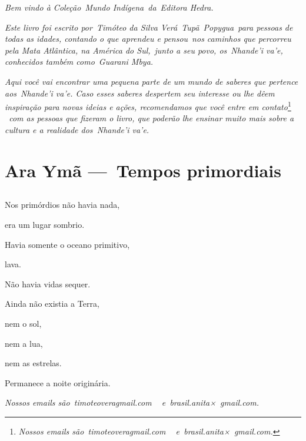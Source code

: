  

\emph{Bem vindo à Coleção}~\emph{\textit{Mundo
Indígena}}~\emph{da}~\emph{\textit{Editora Hedra}.}

 

\emph{Este livro foi escrito por}~\emph{\textit{Timóteo da Silva
Verá}~\textit{Tupã}~\textit{Popygua}}~\emph{para pessoas de todas as
idades, contando o que aprendeu e pensou}~\emph{nos caminhos que
percorreu pela Mata Atlântica, na América do Sul,}~\emph{junto a seu
povo, os}~\textit{Nhande'i va'e}\emph{, conhecidos também
como}~\textit{Guarani Mbya}\emph{.}

 

\emph{Aqui você vai encontrar uma pequena parte de um mundo de saberes
que pertence aos}~\textit{Nhande'i va'e}\emph{. Caso esses saberes
despertem seu interesse ou lhe dêem inspiração para novas ideias e
ações, recomendamos que você entre em
contato}\footnote{\emph{\textit{Nossos emails
são~timoteoveragmail.com
\textbar{}}\textit{~ e~}\textit{brasil.anita×~gmail.com.}}} \emph{~com as pessoas que fizeram o livro, que
poderão lhe ensinar muito mais sobre a cultura e a realidade
dos\textit{}~}\textit{Nhande'i va'e}\emph{.}

 

\part[Tempos primordiais]{Ara Ymã — Tempos primordiais}

\chapter*{}

 

Nos primórdios não havia nada,

era um lugar sombrio.

Havia somente o oceano primitivo,  

lava.  

Não havia vidas sequer.  

 

Ainda não existia a Terra,

nem o sol,

nem a lua,

nem as estrelas.

 

Permanece a noite originária.

 

\emph{\textit{Nossos emails são~timoteoveragmail.com }\textit{~
e~}\textit{brasil.anita×~gmail.com.}}
